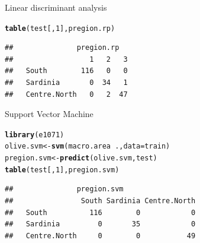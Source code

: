 \documentclass[10pt,xcolor=dvipsnames]{beamer}\usepackage[]{graphicx}\usepackage[]{color}
\makeatletter
\newcommand{\hlnum}[1]{\textcolor[rgb]{0.686,0.059,0.569}{#1}}%
\newcommand{\hlopt}[1]{\textcolor[rgb]{0,0,0}{#1}}%
\newcommand{\hlstd}[1]{\textcolor[rgb]{0.345,0.345,0.345}{#1}}%
\newcommand{\hlkwb}[1]{\textcolor[rgb]{0.69,0.353,0.396}{#1}}%
\newcommand{\hlkwc}[1]{\textcolor[rgb]{0.333,0.667,0.333}{#1}}%
\newcommand{\hlkwd}[1]{\textcolor[rgb]{0.737,0.353,0.396}{\textbf{#1}}}%
\newenvironment{kframe}{%
 \def\at@end@of@kframe{}%
 \ifinner\ifhmode%
  \def\at@end@of@kframe{\end{minipage}}%
  \begin{minipage}{\columnwidth}%
 \fi\fi%
 \def\FrameCommand##1{\hskip\@totalleftmargin \hskip-\fboxsep
 \colorbox{shadecolor}{##1}\hskip-\fboxsep
     \hskip-\linewidth \hskip-\@totalleftmargin \hskip\columnwidth}%
 \MakeFramed {\advance\hsize-\width
   \@totalleftmargin\z@ \linewidth\hsize
   \@setminipage}}%
 {\par\unskip\endMakeFramed%
 \at@end@of@kframe}
\newenvironment{knitrout}{}{} %
\makeatother
\begin{document}
\begin{frame}[fragile]{Linear discriminant analysis}
\begin{knitrout}\footnotesize
{}\color{fgcolor}\begin{kframe}
\begin{alltt}
\hlkwd{table}\hlstd{(test[,}\hlnum{1}\hlstd{], pregion.rp)}
\end{alltt}
\begin{verbatim}
##               pregion.rp
##                  1   2   3
##   South        116   0   0
##   Sardinia       0  34   1
##   Centre.North   0   2  47
\end{verbatim}
\end{kframe}
\end{knitrout}
\end{frame}

\begin{frame}[fragile]{Support Vector Machine}
\begin{knitrout}\footnotesize
{}\color{fgcolor}\begin{kframe}
\begin{alltt}
\hlkwd{library}\hlstd{(e1071)}
\hlstd{olive.svm} \hlkwb{<-}  \hlkwd{svm}\hlstd{(macro.area} \hlopt{~}\hlstd{. ,} \hlkwc{data} \hlstd{= train)}
\hlstd{pregion.svm} \hlkwb{<-} \hlkwd{predict}\hlstd{(olive.svm, test)}
\hlkwd{table}\hlstd{(test[,}\hlnum{1}\hlstd{], pregion.svm)}
\end{alltt}
\begin{verbatim}
##               pregion.svm
##                South Sardinia Centre.North
##   South          116        0            0
##   Sardinia         0       35            0
##   Centre.North     0        0           49
\end{verbatim}
\end{kframe}
\end{knitrout}
\end{frame}
\end{document}
